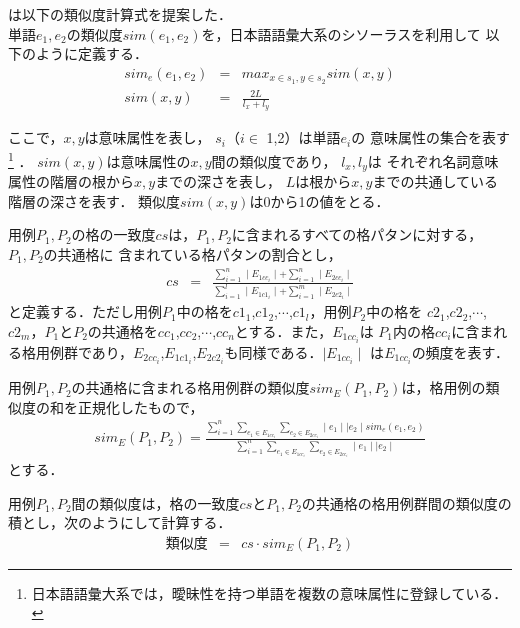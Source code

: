 は以下の類似度計算式を提案した．\\
単語$e_{1},e_{2}$の類似度$sim(e_{1},e_{2})$を，日本語語彙大系\cite{NTT:97}のシソーラスを利用して
以下のように定義する．
\begin{eqnarray}
sim_{e}(e_{1},e_{2}) &=& max_{x\in s_{1},y\in s_{2}} sim(x,y) \nonumber \\
sim(x,y) &=& \frac{2L}{l_{x}+l_{y}} \nonumber
\end{eqnarray}

ここで，$x,y$は意味属性を表し，
$s_{i}$（$i\in$ {1,2}）は単語$e_{i}$の
意味属性の集合を表す
\footnote{日本語語彙大系では，曖昧性を持つ単語を複数の意味属性に登録している．}
．
$sim(x,y)$は意味属性の$x,y$間の類似度であり，
$l_{x},l_{y}$は
それぞれ名詞意味属性の階層の根から$x,y$までの深さを表し，
$L$は根から$x,y$までの共通している
階層の深さを表す．
類似度$sim(x,y)$は0から1の値をとる．

用例$P_{1},P_{2}$の格の一致度$cs$は，$P_{1},P_{2}$に含まれるすべての格パタンに対する，$P_{1},P_{2}$の共通格に
含まれている格パタンの割合とし，
\begin{eqnarray}
cs &=& \frac{\sum^{n}_{i=1}\mid E_{1cc_{i}}\mid + \sum^{n}_{i=1}\mid E_{2cc_{i}}\mid}
{\sum^{l}_{i=1}\mid E_{1c1_{i}}\mid + \sum^{m}_{i=1}\mid E_{2c2_{i}}\mid} \nonumber
\end{eqnarray}
と定義する．ただし用例$P_{1}$中の格を$c1_{1}$,$c1_{2}$,$\cdots$,$c1_{l}$，用例$P_{2}$中の格を
$c2_{1}$,$c2_{2}$,$\cdots$,\\$c2_{m}$，$P_{1}$と$P_{2}$の共通格を$cc_{1}$,$cc_{2}$,$\cdots$,$cc_{n}$とする．また，$E_{1cc_{i}}$は
$P_{1}$内の格$cc_{i}$に含まれる格用例群であり，$E_{2cc_{i}}$,$E_{1c1_{i}}$,$E_{2c2_{i}}$も同様である．$\mid E_{1cc_{i}} \mid$
は$E_{1cc_{i}}$の頻度を表す．

用例$P_{1},P_{2}$の共通格に含まれる格用例群の類似度$sim_{E}(P_{1},P_{2})$は，格用例の類似度の和を正規化したもので，
\begin{eqnarray}
sim_{E}(P_{1},P_{2}) = \frac{\sum^{n}_{i=1} \sum^{}_{e_{1}\in E_{1cc_{i}}} \sum^{}_{e_{2}\in E_{2cc_{i}}} \mid e_{1}\mid \mid e_{2}\mid sim_{e}(e_{1},e_{2})}
{\sum^{n}_{i=1} \sum^{}_{e_{1}\in E_{1cc_{i}}} \sum^{}_{e_{2}\in E_{2cc_{i}}} \mid e_{1}\mid \mid e_{2}\mid} \nonumber
\end{eqnarray}
とする．


用例$P_{1},P_{2}$間の類似度は，格の一致度$cs$と$P_{1},P_{2}$の共通格の格用例群間の類似度の積とし，次のようにして計算する．
\begin{eqnarray}
類似度 &=& cs \cdot sim_{E}(P_{1},P_{2}) \nonumber
\end{eqnarray}

